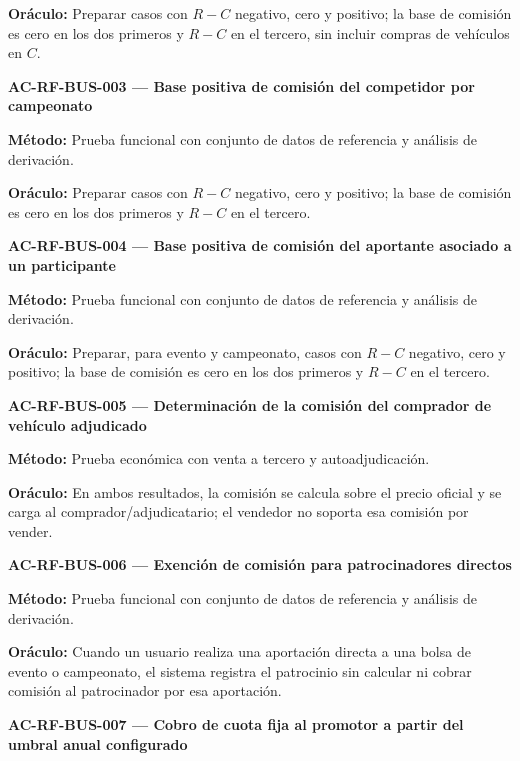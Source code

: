 \documentclass[10pt,letterpaper]{article}
\begin{document}
\textbf{Oráculo:} Preparar casos con $R-C$ negativo, cero y positivo; la base de comisión es cero en los dos primeros y $R-C$ en el tercero, sin incluir compras de vehículos en $C$.\par\vspace{0.45em}
\noindent\textbf{AC-RF-BUS-003 --- Base positiva de comisión del competidor por campeonato}\par
\textbf{Método:} Prueba funcional con conjunto de datos de referencia y análisis de derivación.\par
\textbf{Oráculo:} Preparar casos con $R-C$ negativo, cero y positivo; la base de comisión es cero en los dos primeros y $R-C$ en el tercero.\par\vspace{0.45em}
\noindent\textbf{AC-RF-BUS-004 --- Base positiva de comisión del aportante asociado a un participante}\par
\textbf{Método:} Prueba funcional con conjunto de datos de referencia y análisis de derivación.\par
\textbf{Oráculo:} Preparar, para evento y campeonato, casos con $R-C$ negativo, cero y positivo; la base de comisión es cero en los dos primeros y $R-C$ en el tercero.\par\vspace{0.45em}
\noindent\textbf{AC-RF-BUS-005 --- Determinación de la comisión del comprador de vehículo adjudicado}\par
\textbf{Método:} Prueba económica con venta a tercero y autoadjudicación.\par
\textbf{Oráculo:} En ambos resultados, la comisión se calcula sobre el precio oficial y se carga al comprador/adjudicatario; el vendedor no soporta esa comisión por vender.\par\vspace{0.45em}
\noindent\textbf{AC-RF-BUS-006 --- Exención de comisión para patrocinadores directos}\par
\textbf{Método:} Prueba funcional con conjunto de datos de referencia y análisis de derivación.\par
\textbf{Oráculo:} Cuando un usuario realiza una aportación directa a una bolsa de evento o campeonato, el sistema registra el patrocinio sin calcular ni cobrar comisión al patrocinador por esa aportación.\par\vspace{0.45em}
\noindent\textbf{AC-RF-BUS-007 --- Cobro de cuota fija al promotor a partir del umbral anual configurado}\par
\end{document}
